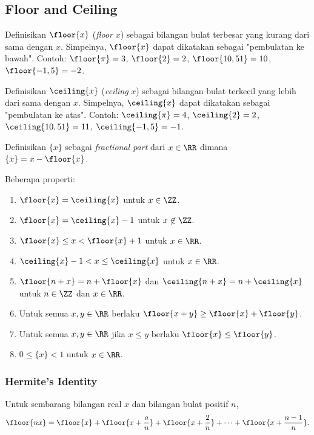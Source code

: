 \subsection{Floor and Ceiling}
Definisikan $\floor{x}$ (\textit{floor} $x$) sebagai bilangan bulat terbesar yang kurang dari sama dengan $x$. Simpelnya, $\floor{x}$ dapat dikatakan sebagai "pembulatan ke bawah". Contoh: $\floor{\pi}=3$, $\floor{2}=2$, $\floor{10,51}=10$, $\floor{-1,5}=-2$.

Definisikan $\ceiling{x}$ (\textit{ceiling} $x$) sebagai bilangan bulat terkecil yang lebih dari sama dengan $x$. Simpelnya, $\ceiling{x}$ dapat dikatakan sebagai "pembulatan ke atas". Contoh: $\ceiling{\pi}=4$, $\ceiling{2}=2$, $\ceiling{10,51}=11$, $\ceiling{-1,5}=-1$.

Definisikan $\{x\}$ sebagai \textit{fractional part} dari $x \in \RR$ dimana $\{x\} = x - \floor{x}$.

Beberapa properti:
\begin{enumerate}
    \item $\floor{x}=\ceiling{x}$ untuk $x \in \ZZ$.
    \item $\floor{x}=\ceiling{x}-1$ untuk $x \not \in \ZZ$.
    \item $\floor{x} \le  x < \floor{x}+1$ untuk $x \in \RR$.
    \item $\ceiling{x}-1 < x \le \ceiling{x}$ untuk $x \in \RR$.
    \item $\floor{n+x}=n+\floor{x}$ dan $\ceiling{n+x}=n+\ceiling{x}$ untuk $n\in \ZZ$ dan $x \in \RR$.
    \item Untuk semua $x,y \in \RR$ berlaku $\floor{x+y} \ge \floor{x}+\floor{y}$.
    \item Untuk semua $x,y \in \RR$ jika $x \le y$ berlaku $\floor{x} \le \floor{y}$.
    \item $0 \le \{x\} < 1$ untuk $x \in \RR$.
\end{enumerate}
\subsubsection{Hermite's Identity}
Untuk sembarang bilangan real $x$ dan bilangan bulat positif $n$,
$$\floor{nx}=\floor{x}+\floor{x+\dfrac{a}{n}}+\floor{x+\dfrac{2}{n}}+\dots+\floor{x+\dfrac{n-1}{n}}.$$
